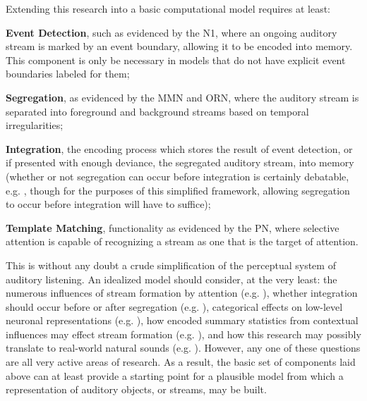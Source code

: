 \documentclass[a4paper,10pt,final]{ThesisStyle}
\begin{document}
Extending this research into a basic computational model requires at least: 
\begin{enumerateb}
\item \textbf{Event Detection}, such as evidenced by the N1, where an ongoing auditory stream is marked by an event boundary, allowing it to be encoded into memory.  This component is only be necessary in models that do not have explicit event boundaries labeled for them; 
\item \textbf{Segregation}, as evidenced by the MMN and ORN, where the auditory stream is separated into foreground and background streams based on temporal irregularities;
\item \textbf{Integration}, the encoding process which stores the result of event detection, or if presented with enough deviance, the segregated auditory stream, into memory (whether or not segregation can occur before integration is certainly debatable, e.g. \cite{Sussman2005}, though for the purposes of this simplified framework, allowing segregation to occur before integration will have to suffice);
\item \textbf{Template Matching}, functionality as evidenced by the PN, where selective attention is capable of recognizing a stream as one that is the target of attention. 
\end{enumerateb}

This is without any doubt a crude simplification of the perceptual system of auditory listening.   An idealized model should consider, at the very least: the numerous influences of stream formation by attention (e.g. \cite{Shamma2011}), whether integration should occur before or after segregation (e.g. \cite{Sussman2005}), categorical effects on low-level neuronal representations (e.g. \cite{Samson2010}), how encoded summary statistics from contextual influences may effect stream formation (e.g. \cite{Piazza2013}), and how this research may possibly translate to real-world natural sounds (e.g. \cite{Moerel2013}).  However, any one of these questions are all very active areas of research.  As a result, the basic set of components laid above can at least provide a starting point for a plausible model from which a representation of auditory objects, or streams, may be built.  

\end{document}
